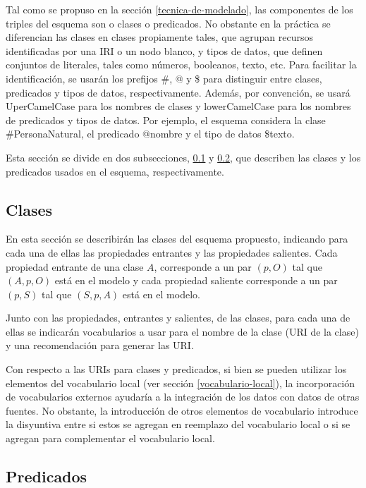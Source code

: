 \documentclass[letterpaper,titlepage]{article}
\begin{document}
Tal como se propuso en la sección \ref{tecnica-de-modelado}, las
componentes de los triples del esquema son o clases o predicados. No
obstante en la práctica se diferencian las clases en clases
propiamente tales, que agrupan recursos identificadas por una IRI o un
nodo blanco, y tipos de datos, que definen conjuntos de literales,
tales como números, booleanos, texto, etc. Para facilitar la
identificación, se usarán los prefijos \#, @ y \$ para distinguir
entre clases, predicados y tipos de datos, respectivamente. Además,
por convención, se usará UperCamelCase para los nombres de clases y
lowerCamelCase para los nombres de predicados y tipos de datos. Por
ejemplo, el esquema considera la clase \#PersonaNatural, el predicado
@nombre y el tipo de datos \$texto.

Esta sección se divide en dos subsecciones, \ref{clases} y
\ref{predicados}, que describen las clases y los predicados usados en
el esquema, respectivamente.

\subsection{Clases}
\label{clases}

En esta sección se describirán las clases del esquema
propuesto, indicando para cada una de ellas las propiedades entrantes
y las propiedades salientes. Cada propiedad entrante de una clase $A$,
corresponde a un par $(p,O)$ tal que $(A,p,O)$ está en el modelo y
cada propiedad saliente corresponde a un par $(p,S)$ tal que $(S,p,A)$
está en el modelo.

Junto con las propiedades, entrantes y salientes, de las clases, para
cada una de ellas se indicarán vocabularios a usar para el nombre de
la clase (URI de la clase) y una recomendación para generar las
URI.

Con respecto a las URIs para clases y predicados, si bien se pueden
utilizar los elementos del vocabulario local (ver sección
\ref{vocabulario-local}), la incorporación de vocabularios externos
ayudaría a la integración de los datos con datos de otras fuentes. No
obstante, la introducción de otros elementos de vocabulario introduce
la disyuntiva entre si estos se agregan en reemplazo del vocabulario
local o si se agregan para complementar el vocabulario local.



\subsection{Predicados}
\label{predicados}
\end{document}
